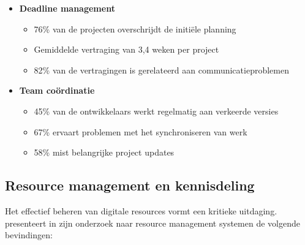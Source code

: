 \begin{itemize}
    \item \textbf{Deadline management}
    \begin{itemize}
        \item 76\% van de projecten overschrijdt de initiële planning
        \item Gemiddelde vertraging van 3,4 weken per project
        \item 82\% van de vertragingen is gerelateerd aan communicatieproblemen
    \end{itemize}
    
    \item \textbf{Team coördinatie}
    \begin{itemize}
        \item 45\% van de ontwikkelaars werkt regelmatig aan verkeerde versies
        \item 67\% ervaart problemen met het synchroniseren van werk
        \item 58\% mist belangrijke project updates
    \end{itemize}
\end{itemize}

\subsection{Resource management en kennisdeling}
\label{subsec:resource-management}

Het effectief beheren van digitale resources vormt een kritieke uitdaging. \textcite{Chen2024a} presenteert in zijn onderzoek naar resource management systemen de volgende bevindingen:

